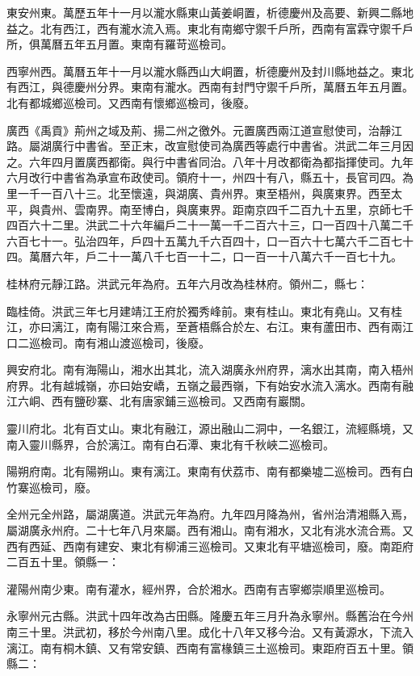 東安州東。萬歷五年十一月以瀧水縣東山黃姜峒置，析德慶州及高要、新興二縣地益之。北有西江，西有瀧水流入焉。東北有南鄉守禦千戶所，西南有富霖守禦千戶所，俱萬曆五年五月置。東南有羅苛巡檢司。

西寧州西。萬曆五年十一月以瀧水縣西山大峒置，析德慶州及封川縣地益之。東北有西江，與德慶州分界。東南有瀧水。西南有封門守禦千戶所，萬曆五年五月置。北有都城鄉巡檢司。又西南有懷鄉巡檢司，後廢。

廣西《禹貢》荊州之域及荊、揚二州之徼外。元置廣西兩江道宣慰使司，治靜江路。屬湖廣行中書省。至正末，改宣慰使司為廣西等處行中書省。洪武二年三月因之。六年四月置廣西都衛。與行中書省同治。八年十月改都衛為都指揮使司。九年六月改行中書省為承宣布政使司。領府十一，州四十有八，縣五十，長官司四。為里一千一百八十三。北至懷遠，與湖廣、貴州界。東至梧州，與廣東界。西至太平，與貴州、雲南界。南至博白，與廣東界。距南京四千二百九十五里，京師七千四百六十二里。洪武二十六年編戶二十一萬一千二百六十三，口一百四十八萬二千六百七十一。弘治四年，戶四十五萬九千六百四十，口一百六十七萬六千二百七十四。萬曆六年，戶二十一萬八千七百一十二，口一百一十八萬六千一百七十九。

桂林府元靜江路。洪武元年為府。五年六月改為桂林府。領州二，縣七：

臨桂倚。洪武三年七月建靖江王府於獨秀峰前。東有桂山。東北有堯山。又有桂江，亦曰漓江，南有陽江來合焉，至蒼梧縣合於左、右江。東有蘆田市、西有兩江口二巡檢司。南有湘山渡巡檢司，後廢。

興安府北。南有海陽山，湘水出其北，流入湖廣永州府界，漓水出其南，南入梧州府界。北有越城嶺，亦曰始安嶠，五嶺之最西嶺，下有始安水流入漓水。西南有融江六峒、西有鹽砂寨、北有唐家鋪三巡檢司。又西南有巖關。

靈川府北。北有百丈山。東北有融江，源出融山二洞中，一名銀江，流經縣境，又南入靈川縣界，合於漓江。南有白石潭、東北有千秋峽二巡檢司。

陽朔府南。北有陽朔山。東有漓江。東南有伏荔市、南有都樂墟二巡檢司。西有白竹寨巡檢司，廢。

全州元全州路，屬湖廣道。洪武元年為府。九年四月降為州，省州治清湘縣入焉，屬湖廣永州府。二十七年八月來屬。西有湘山。南有湘水，又北有洮水流合焉。又西有西延、西南有建安、東北有柳浦三巡檢司。又東北有平塘巡檢司，廢。南距府二百五十里。領縣一：

灌陽州南少東。南有灌水，經州界，合於湘水。西南有吉寧鄉崇順里巡檢司。

永寧州元古縣。洪武十四年改為古田縣。隆慶五年三月升為永寧州。縣舊治在今州南三十里。洪武初，移於今州南八里。成化十八年又移今治。又有黃源水，下流入漓江。南有桐木鎮、又有常安鎮、西南有富椽鎮三土巡檢司。東距府百五十里。領縣二：

